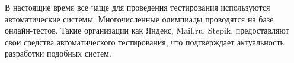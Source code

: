 \Introduction

В настоящие время все чаще для проведения тестирования используются автоматические системы. Многочисленные олимпиады проводятся на базе онлайн-тестов. Такие организации как Яндекс, Mail.ru, Stepik, предоставляют свои средства автоматического тестирования, что подтверждает актуальность разработки подобных систем.